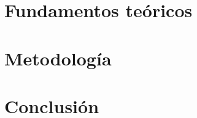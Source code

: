 \documentclass[a4paper,11pt,oneside]{book}
\begin{document}
    
    
    \newpage
    
    

     
    
    
   
    
    
    \tableofcontents
    
    \mainmatter
    
    
    
    \part{Fundamentos teóricos}
    
    
    
    \part{Metodología}
    
    

    \part{Conclusión}
    

    
    
    
    
    
    \begin{appendices}
        
    \end{appendices}
    
\end{document}
